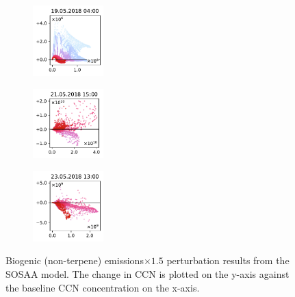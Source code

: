 \begin{figure}[H]
    \begin{subfigure}
        \centering
        \includegraphics[width=0.30\textwidth,valign=t]{evaluation/figures/perturbations/perturbation-19.05.2018:04.00-biogenic-mul-1.5.pdf}
    \end{subfigure}
    \begin{subfigure}
        \centering
        \includegraphics[width=0.30\textwidth,valign=t]{evaluation/figures/perturbations/perturbation-21.05.2018:15.00-biogenic-mul-1.5.pdf}
    \end{subfigure}
    \begin{subfigure}
        \centering
        \includegraphics[width=0.30\textwidth,valign=t]{evaluation/figures/perturbations/perturbation-23.05.2018:13.00-biogenic-mul-1.5.pdf}
    \end{subfigure}

    \caption[Biogenic emissions$\times 1.5$ perturbation SOSAA results]{Biogenic (non-terpene) emissions$\times 1.5$ perturbation results from the SOSAA model. The change in CCN is plotted on the y-axis against the baseline CCN concentration on the x-axis.}
    \label{fig:sosaa-perturbation-biogenic-mul-1.5}
\end{figure}

